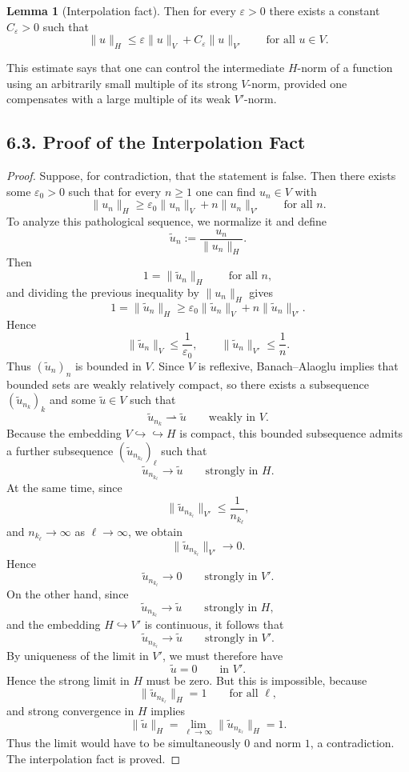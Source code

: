 \documentclass[11pt]{article}
\theoremstyle{definition}
\newtheorem{lemma}{Lemma}
\theoremstyle{remark}
\begin{document}
\begin{lemma}[Interpolation fact]
Then for every $\varepsilon>0$ there exists a constant $C_\varepsilon>0$ such that
\[
  \|u\|_H
  \le
  \varepsilon\|u\|_V + C_\varepsilon\|u\|_{V'}
  \qquad \text{for all } u\in V.
\]
\end{lemma}

This estimate says that one can control the intermediate $H$-norm of a function using an arbitrarily small multiple of its strong $V$-norm, provided one compensates with a large multiple of its weak $V'$-norm.

\subsection*{6.3. Proof of the Interpolation Fact}
\begin{proof}
Suppose, for contradiction, that the statement is false. Then there exists some $\varepsilon_0>0$ such that for every $n\ge 1$ one can find $u_n\in V$ with
\[
  \|u_n\|_H\ge \varepsilon_0\|u_n\|_V+n\|u_n\|_{V'}
  \qquad \text{for all } n.
\]
To analyze this pathological sequence, we normalize it and define
\[
  \widetilde u_n:=\frac{u_n}{\|u_n\|_H}.
\]
Then
\[
  1=\|\widetilde u_n\|_H
  \qquad \text{for all } n,
\]
and dividing the previous inequality by $\|u_n\|_H$ gives
\[
  1=\|\widetilde u_n\|_H\ge \varepsilon_0\|\widetilde u_n\|_V+n\|\widetilde u_n\|_{V'}.
\]
Hence
\[
  \|\widetilde u_n\|_V\le \frac{1}{\varepsilon_0},
  \qquad
  \|\widetilde u_n\|_{V'}\le \frac{1}{n}.
\]
Thus $(\widetilde u_n)_n$ is bounded in $V$. Since $V$ is reflexive, Banach--Alaoglu implies that bounded sets are weakly relatively compact, so there exists a subsequence $(\widetilde u_{n_k})_k$ and some $\widetilde u\in V$ such that
\[
  \widetilde u_{n_k}\rightharpoonup \widetilde u
  \qquad \text{weakly in } V.
\]
Because the embedding $V\hookrightarrow\hookrightarrow H$ is compact, this bounded subsequence admits a further subsequence $(\widetilde u_{n_{k_\ell}})_\ell$ such that
\[
  \widetilde u_{n_{k_\ell}}\to \widetilde u
  \qquad \text{strongly in } H.
\]
At the same time, since
\[
  \|\widetilde u_{n_{k_\ell}}\|_{V'}\le \frac{1}{n_{k_\ell}},
\]
and $n_{k_\ell}\to\infty$ as $\ell\to\infty$, we obtain
\[
  \|\widetilde u_{n_{k_\ell}}\|_{V'}\to 0.
\]
Hence
\[
  \widetilde u_{n_{k_\ell}}\to 0
  \qquad \text{strongly in } V'.
\]
On the other hand, since
\[
  \widetilde u_{n_{k_\ell}}\to \widetilde u
  \qquad \text{strongly in } H,
\]
and the embedding $H\hookrightarrow V'$ is continuous, it follows that
\[
  \widetilde u_{n_{k_\ell}}\to \widetilde u
  \qquad \text{strongly in } V'.
\]
By uniqueness of the limit in $V'$, we must therefore have
\[
  \widetilde u=0
  \qquad \text{in } V'.
\]
Hence the strong limit in $H$ must be zero. But this is impossible, because
\[
  \|\widetilde u_{n_{k_\ell}}\|_H=1
  \qquad \text{for all } \ell,
\]
and strong convergence in $H$ implies
\[
  \|\widetilde u\|_H=\lim_{\ell\to\infty}\|\widetilde u_{n_{k_\ell}}\|_H=1.
\]
Thus the limit would have to be simultaneously $0$ and norm $1$, a contradiction. The interpolation fact is proved.
\end{proof}
\end{document}
